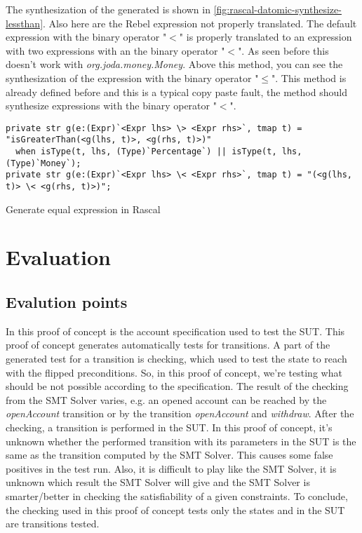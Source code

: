 The synthesization of the generated is shown in
\autoref{fig:rascal-datomic-synthesize-lessthan}. Also here are the Rebel
expression not properly translated. The default expression with the binary
operator "$<$" is properly translated to an expression with two expressions with
 an the binary operator "$<$". As seen before this doesn't work with
 \textit{org.joda.money.Money}. Above this method, you can see the
 synthesization of the expression with the binary operator "$\leq$". This method
 is already defined before and this is a typical copy paste fault, the method
 should synthesize expressions with the binary operator "$<$".


\begin{sourcecode}[h!]
\begin{lstlisting}[]
private str g(e:(Expr)`<Expr lhs> \> <Expr rhs>`, tmap t) = "isGreaterThan(<g(lhs, t)>, <g(rhs, t)>)"
  when isType(t, lhs, (Type)`Percentage`) || isType(t, lhs, (Type)`Money`);
private str g(e:(Expr)`<Expr lhs> \< <Expr rhs>`, tmap t) = "(<g(lhs, t)> \< <g(rhs, t)>)";
\end{lstlisting}
\caption{Generate equal expression in Rascal}
\label{fig:rascal-datomic-synthesize-lessthan}
\end{sourcecode}

\section{Evaluation}
\label{sec:ch4-evaluation}

\subsection{Evalution points}
In this proof of concept is the account specification used to test the SUT.
This proof of concept generates automatically tests for transitions. A part of
the generated test for a transition is checking, which used to test the state to
reach with the flipped preconditions. So, in this proof of concept, we're
testing what should be not possible according to the specification. The result
of the checking from the SMT Solver varies, e.g. an opened account can be
reached by the \textit{openAccount} transition or by the transition
\textit{openAccount} and \textit{withdraw}. After the checking, a transition
is performed in the SUT. In this proof of concept, it's unknown whether the
performed transition with its parameters in the SUT is the same as the
transition computed by the SMT Solver. This causes some false positives in the
test run. Also, it is difficult to play like the SMT Solver, it is unknown which
result the SMT Solver will give and the SMT Solver is smarter/better in checking
the satisfiability of a given constraints. To conclude, the checking used in
this proof of concept tests only the states and in the SUT are transitions
tested.

